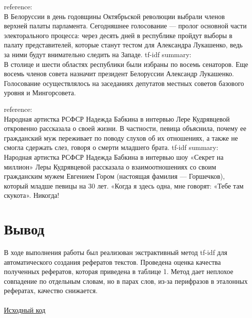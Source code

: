 \documentclass[a4paper]{article}
\begin{document}
    \begin{tcolorbox}[title=precision: 0.2944 | recall: 0.2498 | f-measure: 0.2691, fonttitle=\bfseries]
        reference:\\
        В Белоруссии в день годовщины Октябрьской революции выбрали членов верхней палаты парламента. Сегодняшнее голосование — пролог основной части электорального процесса: через десять дней в республике пройдут выборы в палату представителей, которые станут тестом для Александра Лукашенко, ведь за ними будут внимательно следить на Западе.
        \tcblower
        tf-idf summary:\\ 
        В столице и шести областях республики были избраны по восемь сенаторов. Еще восемь членов совета назначит президент Белоруссии Александр Лукашенко. Голосование осуществлялось на заседаниях депутатов местных советов базового уровня и Мингорсовета.    
    \end{tcolorbox}

    \begin{tcolorbox}[title=precision: 0.3245 | recall: 0.2936 | f-measure: 0.3067, fonttitle=\bfseries]
        reference:\\
        Народная артистка РСФСР Надежда Бабкина в интервью Лере Кудрявцевой откровенно рассказала о своей жизни. В частности, певица объяснила, почему ее гражданский муж переживает по поводу слухов об их отношениях, а также не смогла сдержать слез, говоря о смерти младшего брата.
        \tcblower
        tf-idf summary:\\ 
        Народная артистка РСФСР Надежда Бабкина в интервью шоу «Секрет на миллион» Леры Кудрявцевой рассказала о взаимоотношениях со своим гражданским мужем Евгением Гором (настоящая фамилия — Горшечков), который младше певицы на 30 лет. «Когда я здесь одна, мне говорят: «Тебе там скукота». Никогда!
    \end{tcolorbox}

\section{Вывод} 
    В ходе выполнения работы был реализован экстрактивный метод tf-idf для автоматического создания рефератов текстов. 
Проведена оценка качества полученных рефератов, которая приведена в таблице 1. Метод дает неплохое совпадение по отдельным словам, но в парах слов, из-за перифразов в эталонных рефератах, качество снижается.
\\\\
    \href{https://github.com/Berletm/text-summarizer}
        {\color{black!60}\faGithub\small Исходный код}
\end{document}
